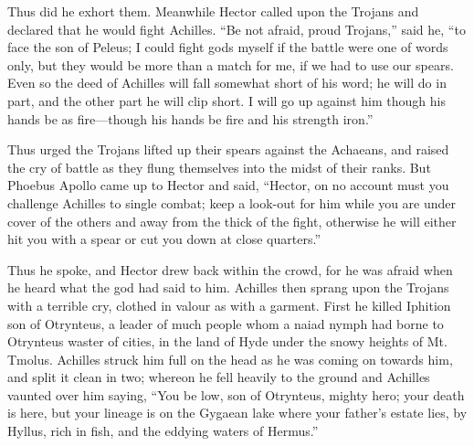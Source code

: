 Thus did he exhort them. Meanwhile Hector called upon the Trojans and
declared that he would fight Achilles. “Be not afraid, proud Trojans,”
said he, “to face the son of Peleus; I could fight gods myself if the
battle were one of words only, but they would be more than a match for me,
if we had to use our spears. Even so the deed of Achilles will fall
somewhat short of his word; he will do in part, and the other part he will
clip short. I will go up against him though his hands be as fire—though
his hands be fire and his strength iron.”

Thus urged the Trojans lifted up their spears against the Achaeans, and
raised the cry of battle as they flung themselves into the midst of their
ranks. But Phoebus Apollo came up to Hector and said, “Hector, on no
account must you challenge Achilles to single combat; keep a look-out for
him while you are under cover of the others and away from the thick of the
fight, otherwise he will either hit you with a spear or cut you down at
close quarters.”

Thus he spoke, and Hector drew back within the crowd, for he was afraid
when he heard what the god had said to him. Achilles then sprang upon the
Trojans with a terrible cry, clothed in valour as with a garment. First he
killed Iphition son of Otrynteus, a leader of much people whom a naiad
nymph had borne to Otrynteus waster of cities, in the land of Hyde under
the snowy heights of Mt. Tmolus. Achilles struck him full on the head as
he was coming on towards him, and split it clean in two; whereon he fell
heavily to the ground and Achilles vaunted over him saying, “You be low,
son of Otrynteus, mighty hero; your death is here, but your lineage is on
the Gygaean lake where your father’s estate lies, by Hyllus, rich in fish,
and the eddying waters of Hermus.”

